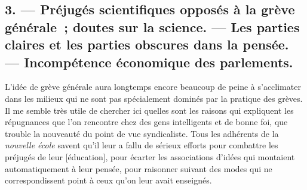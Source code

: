 \documentclass[french,twoside]{book} %
\newcommand\corr[1]{#1}
\begin{document}
\subsection[{3. — Préjugés scientifiques opposés à la grève générale ; doutes sur la science. — Les parties claires et les parties obscures dans la pensée. — Incompétence économique des parlements.}]{3. — Préjugés scientifiques opposés à la grève générale ; doutes sur la science. — Les parties claires et les parties obscures dans la pensée. — Incompétence économique des parlements.}
\label{p18}
\noindent L’idée de grève générale aura longtemps encore beaucoup de peine à s’acclimater dans les milieux qui ne sont pas spécialement dominés par la pratique des grèves. Il me semble très utile de chercher ici quelles sont les raisons qui expliquent les répugnances que l’on rencontre chez des gens intelligents et de bonne foi, que trouble la nouveauté du point de vue syndicaliste. Tous les adhérents de la \emph{nouvelle école} savent qu’il leur a fallu de sérieux efforts pour combattre les préjugés de leur [{\corr éducation}], pour écarter les associations d’idées qui montaient automatiquement à leur pensée, pour raisonner suivant des modes qui ne correspondissent point à ceux qu’on leur avait enseignés.\par
\end{document}
